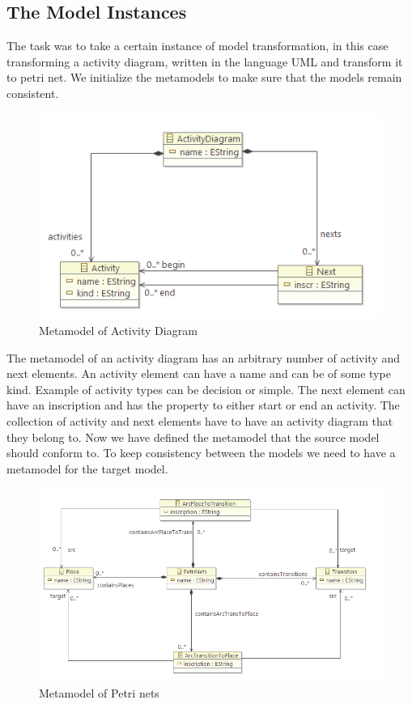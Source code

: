 \documentclass[pdftex,11pt,a4paper]{article}
\begin{document}
\subsection{The Model Instances}
The task was to take a certain instance of model transformation, in this case
transforming a activity diagram, written in the language UML and
transform it to petri net. We initialize the metamodels to make sure that the
models remain consistent.

\begin{figure}[H]
	\centering
	\includegraphics[scale=0.5]{figures/ActivityMetamodel.png}
	\caption{Metamodel of Activity Diagram }
\end{figure}

The metamodel of an activity diagram has an arbitrary number of activity and
next elements. An activity element can have a name and can be of some type kind.
Example of activity types can be decision or simple. The next element can have
an inscription and has the property to either start or end an activity. The
collection of activity and next elements have to have an activity diagram that
they belong to. Now we have defined the metamodel that the source model should
conform to. To keep consistency between the models we need to have a
metamodel for the target model.

\begin{figure}[H]
	\centering
	\includegraphics[scale=0.5]{figures/PetriNetsMetamodel.png}
	\caption{Metamodel of Petri nets}
\end{figure}
\end{document}
